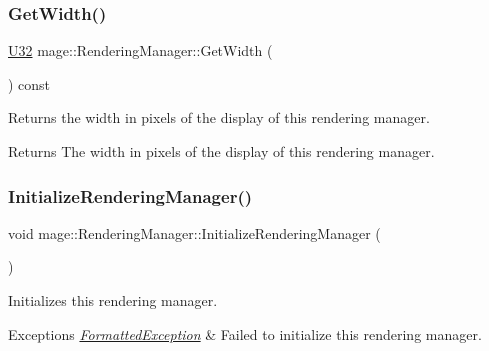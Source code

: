 \subsubsection{\texorpdfstring{Get\+Width()}{GetWidth()}}
{\footnotesize\ttfamily \hyperlink{namespacemage_a41c104c036fba3756a74e19f793eeaa1}{U32} mage\+::\+Rendering\+Manager\+::\+Get\+Width (\begin{DoxyParamCaption}{ }\end{DoxyParamCaption}) const\hspace{0.3cm}{\ttfamily [noexcept]}}

Returns the width in pixels of the display of this rendering manager.

\begin{DoxyReturn}{Returns}
The width in pixels of the display of this rendering manager. 
\end{DoxyReturn}
\hypertarget{classmage_1_1_rendering_manager_a7ce05cf44393fbd62d7269440f6d1503}{}\label{classmage_1_1_rendering_manager_a7ce05cf44393fbd62d7269440f6d1503} 
\subsubsection{\texorpdfstring{Initialize\+Rendering\+Manager()}{InitializeRenderingManager()}}
{\footnotesize\ttfamily void mage\+::\+Rendering\+Manager\+::\+Initialize\+Rendering\+Manager (\begin{DoxyParamCaption}{ }\end{DoxyParamCaption})\hspace{0.3cm}{\ttfamily [private]}}

Initializes this rendering manager.


\begin{DoxyExceptions}{Exceptions}
{\em \hyperlink{structmage_1_1_formatted_exception}{Formatted\+Exception}} & Failed to initialize this rendering manager. \\
\hline
\end{DoxyExceptions}
\hypertarget{classmage_1_1_rendering_manager_ae3050ca59c06856a86254c06b6695d89}{}\label{classmage_1_1_rendering_manager_ae3050ca59c06856a86254c06b6695d89} 
